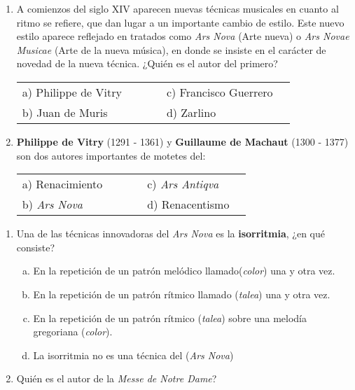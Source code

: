 \documentclass[letterpaper,12pt,notitlepage,spanish]{article}
\begin{document}
%
\begin{ejercicio}[]	
	\begin{enumerate}[1.-]
%
%
		\item  
		A comienzos del siglo XIV aparecen nuevas técnicas musicales en cuanto al ritmo se refiere, que dan lugar a un importante cambio de estilo. Este nuevo estilo aparece reflejado en tratados como \textit{Ars Nova} (Arte nueva) o \textit{Ars Novae Musicae} (Arte de la nueva música), en donde se insiste en el carácter de novedad de la nueva técnica. ¿Quién es el autor del primero?
		\par
	\begin{tabular}{l l l l l l}
	a) Philippe de Vitry  &  &  &   & c) Francisco Guerrero &  \\
	b) Juan de Muris &  &  &  & d) Zarlino &  \\
	\end{tabular} 
%
%
	\item 
	\textbf{Philippe de Vitry} (1291 - 1361) y \textbf{Guillaume de Machaut} (1300 - 1377) son dos autores importantes de motetes del:
	\par
	\begin{tabular}{l l l l l l}
	a) Renacimiento &  &  &   & c) \textit{Ars Antiqva} &  \\
	b) \textit{Ars Nova} &  &  &  & d) Renacentismo &  \\
	\end{tabular} 	
	\end{enumerate}
\end{ejercicio}
%
%
\begin{ejercicio}[]
	\begin{enumerate}[1.-]
%
%
		\item 
		Una de las técnicas innovadoras del \textit{Ars Nova} es la \textbf{isorritmia}, ¿en qué consiste?
          \begin{enumerate}[a)]
	    	\item En la repetición de un patrón melódico llamado(\textit{color}) una y otra vez.
	    	\item En la repetición de un patrón rítmico llamado (\textit{talea}) una y otra vez.
	    	\item En la repetición de un patrón rítmico (\textit{talea}) sobre una melodía gregoriana (\textit{color}).
	    	\item La isorritmia no es una técnica del (\textit{Ars Nova})
	    \end{enumerate}		
%
%
		\item 
		Quién es el autor de la \textit{Messe de Notre Dame}? \dotfill
%
	\end{enumerate}
\end{ejercicio}
\end{document}
